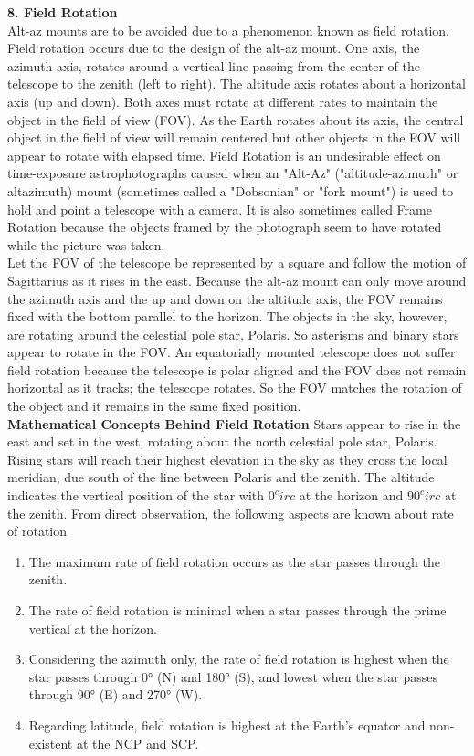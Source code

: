 \documentclass[a4paper,12pt]{extarticle}
\begin{document}
\textbf{8. Field Rotation}\\

Alt-az mounts are to be avoided due to a phenomenon
known as field rotation. Field rotation occurs due to
the design of the alt-az mount. One axis, the azimuth
axis, rotates around a vertical line passing from the
center of the telescope to the zenith (left to right). The altitude axis rotates about a horizontal axis (up and down). Both axes must rotate at different rates to maintain the object in the field of view (FOV). As the Earth rotates about its axis, the central object in the field of view will remain centered but other objects in the FOV will appear to rotate with elapsed time. Field Rotation is an undesirable effect on time-exposure astrophotographs caused when an "Alt-Az" ("altitude-azimuth" or altazimuth) mount (sometimes called a "Dobsonian" or "fork mount") is used to hold and point a telescope with a camera. It is also sometimes called Frame Rotation because the objects framed by the photograph seem to have rotated while the picture was taken.\\

Let the FOV of the telescope be represented by a
square and follow the motion of Sagittarius as it
rises in the east. Because the alt-az mount can only
move around the azimuth axis and the up and down
on the altitude axis, the FOV remains fixed with the
bottom parallel to the horizon. The objects in the sky, however, are rotating around the celestial pole star, Polaris. So asterisms and binary stars appear to rotate in the FOV. An equatorially mounted telescope does not suffer field rotation because the telescope is polar aligned and the FOV does not remain horizontal as it tracks; the telescope rotates. So the FOV matches the rotation of the object and it remains in the same fixed position.\\

\textbf{Mathematical Concepts Behind Field Rotation}
Stars appear to rise in the east and set in the west, rotating about the north celestial pole star, Polaris. Rising stars will reach their highest elevation in the sky as they cross the local meridian, due south of the line between Polaris and the zenith. The altitude indicates the vertical position of the star with $0^circ$ at the horizon and $90^circ$ at the zenith. From direct observation, the following aspects are known about rate of rotation
\begin{enumerate}
	\item The maximum rate of field rotation occurs as the star passes through the zenith.
	\item The rate of field rotation is minimal when a star passes through the prime vertical at the
	horizon.
	\item Considering the azimuth only, the rate of field rotation is highest when the star passes
	through 0° (N) and 180° (S), and lowest when
	the star passes through 90° (E) and 270° (W).
	\item Regarding latitude, field rotation is highest at the Earth’s equator and non-existent at the NCP and SCP.
\end{enumerate}
\end{document}
